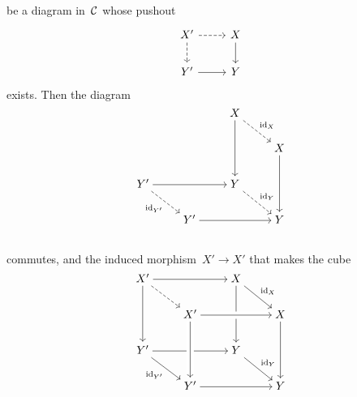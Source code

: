 \begin{remark*}
\begin{enumerate}
\begin{itemize}
\[          \]
          be a diagram in~$\mathcal{C}$ whose pushout
          \[
            \begin{tikzcd}
                X'
                \arrow[dashed]{r}
                \arrow[dashed]{d}
              & X
                \arrow{d}
              \\
                Y'
                \arrow{r}
              & Y
            \end{tikzcd}
          \]
          exists.
          Then the diagram
          \[
            \begin{tikzcd}[cramped]
                {}
              & {}
              & X
                \arrow{dd}
                \arrow[dashed]{dr}[above right]{\id_X}
              & {}
              \\
                {}
              & {}
              & {}
              & X
                \arrow{dd}
              \\
                Y'
                \arrow{rr}
                \arrow[dashed]{dr}[below left]{\id_{Y'}}
              & {}
              & Y
                \arrow[dashed]{dr}[above right]{\id_Y}
              & {}
              \\
                {}
              & Y'
                \arrow{rr}
              & {}
              & Y
              \\
            \end{tikzcd}
          \]
          commutes, and the induced morphism~$X' \to X'$ that makes the cube
          \[
            \begin{tikzcd}[cramped]
                X'
                \arrow{rr}
                \arrow[dashed]{dr}
                \arrow{dd}
              & {}
              & X
                \arrow{dd}
                \arrow{dr}[above right]{\id_X}
              & {}
              \\
                {}
              & X'
              & {}
              & X
                \arrow[from=ll, crossing over]
                \arrow{dd}
              \\
                Y'
                \arrow{rr}
                \arrow{dr}[below left]{\id_{Y'}}
              & {}
              & Y
                \arrow{dr}[above right]{\id_Y}
              & {}
              \\
                {}
              & Y'
                \arrow[from=uu, crossing over]
                \arrow{rr}
              & {}
              & Y
              \\

\end{tikzcd}\]
\end{itemize}
\end{enumerate}
\end{remark*}
